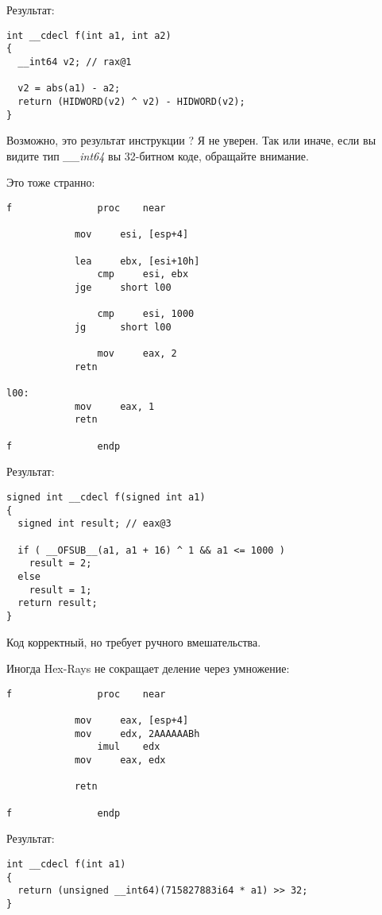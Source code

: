 Результат:

\begin{lstlisting}[style=customc]
int __cdecl f(int a1, int a2)
{
  __int64 v2; // rax@1

  v2 = abs(a1) - a2;
  return (HIDWORD(v2) ^ v2) - HIDWORD(v2);
}
\end{lstlisting}

Возможно, это результат инструкции ? Я не уверен.
Так или иначе, если вы видите тип \emph{\_\_int64} вы 32-битном коде, обращайте внимание.

Это тоже странно:

\begin{lstlisting}[style=customasmx86]
f               proc    near

	        mov     esi, [esp+4]

        	lea     ebx, [esi+10h]
                cmp     esi, ebx
	        jge     short l00

                cmp     esi, 1000
	        jg      short l00

                mov     eax, 2
	        retn

l00:
	        mov     eax, 1
        	retn

f               endp
\end{lstlisting}

Результат:

\begin{lstlisting}[style=customc]
signed int __cdecl f(signed int a1)
{
  signed int result; // eax@3

  if ( __OFSUB__(a1, a1 + 16) ^ 1 && a1 <= 1000 )
    result = 2;
  else
    result = 1;
  return result;
}
\end{lstlisting}

Код корректный, но требует ручного вмешательства.

Иногда Hex-Rays не сокращает деление через умножение:

\begin{lstlisting}[style=customasmx86]
f               proc    near

        	mov     eax, [esp+4]
	        mov     edx, 2AAAAAABh
                imul    edx
        	mov     eax, edx

	        retn

f               endp
\end{lstlisting}

Результат:

\begin{lstlisting}[style=customc]
int __cdecl f(int a1)
{
  return (unsigned __int64)(715827883i64 * a1) >> 32;
}
\end{lstlisting}

